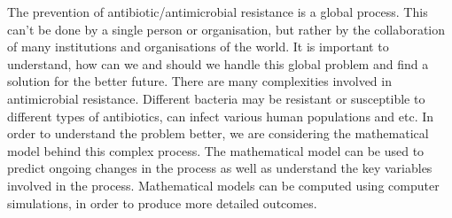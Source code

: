 The prevention of antibiotic/antimicrobial resistance is a global process. This can't be done by a single person or organisation, but rather by the collaboration of many institutions and organisations of the world. It is important to understand, how can we and should we handle this global problem and find a solution for the better future. There are many complexities involved in antimicrobial resistance. Different bacteria may be resistant or susceptible to different types of antibiotics, can infect various human populations and etc. In order to understand the problem better, we are considering the mathematical model behind this complex process. The mathematical model can be used to predict ongoing changes in the process as well as understand the key variables involved in the process. Mathematical models can be computed using computer simulations, in order to produce more detailed outcomes.

